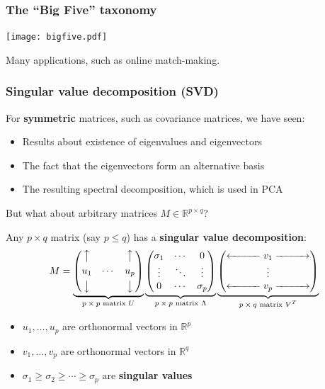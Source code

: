 \documentclass[smaller,handout]{beamer}
\def\R{{\mathbb R}}
\def\darkred{\color{red!70!black}}
\def\darkgreen{\color{green!60!black}}
\def\v2{{\vskip.2in}}
\def\R{{\mathbb R}}
\begin{document}
\begin{frame}
\frametitle{The ``Big Five'' taxonomy}

\texttt{[image: bigfive.pdf]}

\pause\v2
\alert{Many applications, such as online match-making.}

\end{frame}

\begin{frame}
\frametitle{Singular value decomposition (SVD)}

For {\bf symmetric} matrices, such as covariance matrices, we have seen:
\begin{itemize}
\item Results about existence of eigenvalues and eigenvectors
\item The fact that the eigenvectors form an alternative basis
\item The resulting spectral decomposition, which is used in PCA
\end{itemize}
But what about arbitrary matrices $M \in \R^{p \times q}$? 

\pause\v2
\alert{Any $p \times q$ matrix (say $p \leq q$) has a {\bf singular value decomposition}:}
{\darkred 
$$
M = 
\underbrace{\begin{pmatrix}
\big\uparrow    &         & \big\uparrow \\[.05in]
u_1             &  \cdots  & u_p  \\[.05in]
\big\downarrow  &         & \big\downarrow
\end{pmatrix}}_{\text{$p \times p$ matrix $U$}}
\underbrace{\begin{pmatrix}
\sigma_1  & \cdots & 0       \\
\vdots    & \ddots & \vdots  \\
0         & \cdots & \sigma_p            
\end{pmatrix}}_{\text{$p \times p$ matrix $\Lambda$}}
\underbrace{\begin{pmatrix} 
\xleftarrow{\hspace*{1cm}} v_1 \xrightarrow{\hspace*{1cm}} \\
\vdots \\
\xleftarrow{\hspace*{1cm}} v_p \xrightarrow{\hspace*{1cm}} 
\end{pmatrix}}_{\text{$p\times q$ matrix $V^T$}}
$$}
\begin{itemize}
\item {\darkgreen $u_1, \ldots, u_p$ are orthonormal vectors in $\R^p$}
\item {\darkgreen $v_1, \ldots, v_p$ are orthonormal vectors in $\R^q$}
\item {\darkgreen $\sigma_1 \geq \sigma_2 \geq \cdots \geq \sigma_p$ are {\bf singular values}}
\end{itemize}

\end{frame}
\end{document}
